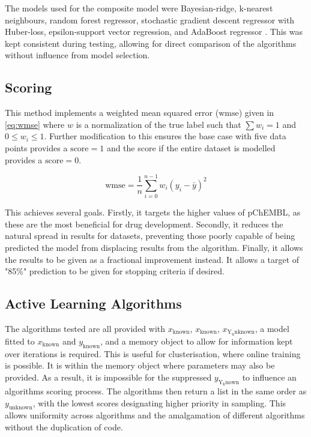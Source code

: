 The models used for the composite model were Bayesian-ridge, k-nearest neighbours, random forest regressor, stochastic gradient descent regressor with Huber-loss, epsilon-support vector regression, and AdaBoost regressor \cite{scikit}. This was kept consistent during testing, allowing for direct comparison of the algorithms without influence from model selection.

\subsection{Scoring}
This method implements a weighted mean squared error ($\mathrm{wmse}$) given in \ref{eq:wmse} where $w$ is a normalization of the true label such that $\sum{w_i}=1$ and ${0\leq{}w_i\leq{}1}$. Further modification to this ensures the base case with five data points provides a $\mathrm{score}=1$ and the score if the entire dataset is modelled provides a $\mathrm{score}=0$.

\begin{equation}
  \mathrm{wmse}=\frac{1}{n}\sum_{i=0}^{n-1}{w_i(y_i-\bar{y})^2}
  \label{eq:wmse}
\end{equation}

This achieves several goals. Firstly, it targets the higher values of pChEMBL, as these are the most beneficial for drug development. Secondly, it reduces the natural spread in results for datasets, preventing those poorly capable of being predicted the model from displacing results from the algorithm. Finally, it allows the results to be given as a fractional improvement instead. It allows a target of "85\%" prediction to be given for stopping criteria if desired.

\subsection{Active Learning Algorithms}
The algorithms tested are all provided with $x_\mathrm{known}$, $x_\mathrm{known}$, $x_\mathrm{Y_unknown}$, a model fitted to $x_\mathrm{known}$ and $y_\mathrm{known}$, and a memory object to allow for information kept over iterations is required. This is useful for clusterisation, where online training is possible. It is within the memory object where parameters may also be provided. As a result, it is impossible for the suppressed $y_\mathrm{Y_known}$ to influence an algorithms scoring process. The algorithms then return a list in the same order as $y_\mathrm{unknown}$, with the lowest scores designating higher priority in sampling. This allows uniformity across algorithms and the amalgamation of different algorithms without the duplication of code.

